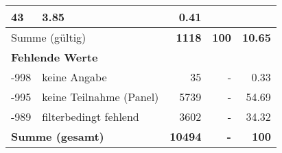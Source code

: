 \begin{longtable}{lXrrr}
       \num{43} &
       \num[round-mode=places,round-precision=2]{3.85} &
         \num[round-mode=places,round-precision=2]{0.41} \\
     \midrule
     \multicolumn{2}{l}{Summe (gültig)} &
       \textbf{\num{1118}} &
     \textbf{\num{100}} &
       \textbf{\num[round-mode=places,round-precision=2]{10.65}} \\
     \multicolumn{5}{l}{\textbf{Fehlende Werte}}\\
       -998 &
       keine Angabe &
         \num{35} &
        - &
         \num[round-mode=places,round-precision=2]{0.33} \\
       -995 &
       keine Teilnahme (Panel) &
         \num{5739} &
        - &
         \num[round-mode=places,round-precision=2]{54.69} \\
       -989 &
       filterbedingt fehlend &
         \num{3602} &
        - &
         \num[round-mode=places,round-precision=2]{34.32} \\
     \midrule
     \multicolumn{2}{l}{\textbf{Summe (gesamt)}} &
          \textbf{\num{10494}} &
        \textbf{-} &
        \textbf{\num{100}} \\
     \bottomrule
     \end{longtable}
     
